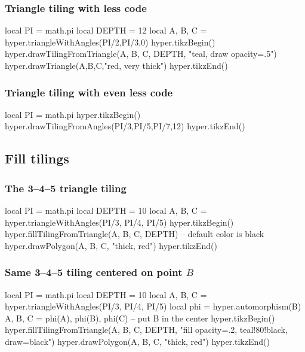 \documentclass{article}
\begin{document}
\subsubsection{Triangle tiling with less code}
\begin{codeandresult}
\begin{luacode*}
local PI = math.pi
local DEPTH = 12
local A, B, C = hyper.triangleWithAngles(PI/2,PI/3,0)
hyper.tikzBegin()
hyper.drawTilingFromTriangle(A, B, C, DEPTH, "teal, draw opacity=.5")
hyper.drawTriangle(A,B,C,"red, very thick")
hyper.tikzEnd()
\end{luacode*}
\end{codeandresult}


\subsubsection{Triangle tiling with even less code}
\begin{codeandresult}
\begin{luacode*}
local PI = math.pi
hyper.tikzBegin()
hyper.drawTilingFromAngles(PI/3,PI/5,PI/7,12)
hyper.tikzEnd()
\end{luacode*}
\end{codeandresult}


\subsection{Fill tilings}

\subsubsection{The 3--4--5 triangle tiling}
\begin{codeandresult}
\begin{luacode*}
local PI = math.pi
local DEPTH = 10
local A, B, C = hyper.triangleWithAngles(PI/3, PI/4, PI/5)
hyper.tikzBegin()
hyper.fillTilingFromTriangle(A, B, C, DEPTH)
-- default color is black
hyper.drawPolygon(A, B, C, "thick, red")
hyper.tikzEnd()
\end{luacode*}
\end{codeandresult}

\subsubsection{Same 3--4--5 tiling centered on point $B$}
\begin{codeandresult}
\begin{luacode*}
local PI = math.pi
local DEPTH = 10
local A, B, C = hyper.triangleWithAngles(PI/3, PI/4, PI/5)
local phi = hyper.automorphism(B)
A, B, C = phi(A), phi(B), phi(C) -- put B in the center
hyper.tikzBegin()
hyper.fillTilingFromTriangle(A, B, C, DEPTH, "fill opacity=.2, teal!80!black, draw=black")
hyper.drawPolygon(A, B, C, "thick, red")
hyper.tikzEnd()
\end{luacode*}
\end{codeandresult}
\end{document}
